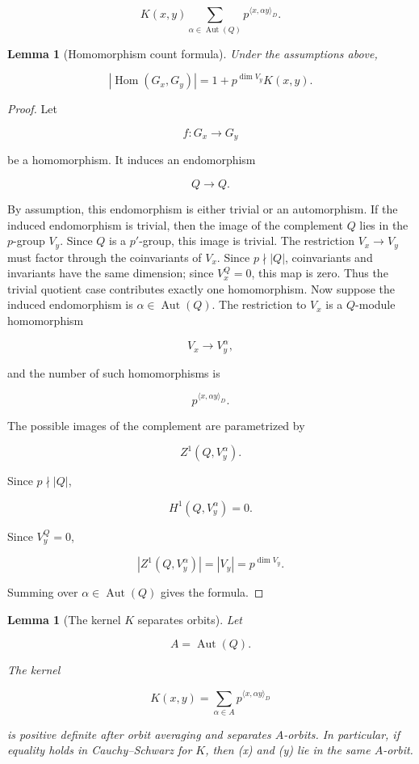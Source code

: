\documentclass[11pt]{article}
\newtheorem{lemma}[theorem]{Lemma}
\begin{document}
\[
K(x,y)
\sum_{\alpha\in\operatorname{Aut}(Q)}
p^{\langle x,\alpha y\rangle_D}.
\]

\begin{lemma}[Homomorphism count formula]
Under the assumptions above,

\[
|\operatorname{Hom}(G_x,G_y)|
=1+p^{\dim V_y}K(x,y).
\]

\end{lemma}

\begin{proof}
Let

\[
f:G_x\to G_y
\]

be a homomorphism. It induces an endomorphism

\[
Q\to Q.
\]

By assumption, this endomorphism is either trivial or an automorphism. If the induced endomorphism is trivial, then the image of the complement $Q$ lies in the $p$-group $V_y$. Since $Q$ is a $p'$-group, this image is trivial. The restriction $V_x\to V_y$ must factor through the coinvariants of $V_x$. Since $p\nmid |Q|$, coinvariants and invariants have the same dimension; since $V_x^Q=0$, this map is zero. Thus the trivial quotient case contributes exactly one homomorphism. Now suppose the induced endomorphism is $\alpha\in\operatorname{Aut}(Q)$. The restriction to $V_x$ is a $Q$-module homomorphism

\[
V_x\to V_y^\alpha,
\]

and the number of such homomorphisms is

\[
p^{\langle x,\alpha y\rangle_D}.
\]

The possible images of the complement are parametrized by

\[
Z^1(Q,V_y^\alpha).
\]

Since $p\nmid |Q|$,

\[
H^1(Q,V_y^\alpha)=0.
\]

Since $V_y^Q=0$,

\[
|Z^1(Q,V_y^\alpha)|=|V_y|=p^{\dim V_y}.
\]

Summing over $\alpha\in\operatorname{Aut}(Q)$ gives the formula.

\end{proof}

\begin{lemma}[The kernel $K$ separates orbits]
Let

\[
A=\operatorname{Aut}(Q).
\]

The kernel

\[
K(x,y)=\sum_{\alpha\in A}p^{\langle x,\alpha y\rangle_D}
\]

is positive definite after orbit averaging and separates $A$-orbits. In particular, if equality holds in Cauchy--Schwarz for $K$, then (x) and (y) lie in the same $A$-orbit.

\end{lemma}
\end{document}
